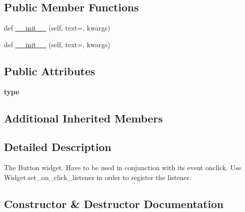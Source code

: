 \subsection*{Public Member Functions}
\begin{DoxyCompactItemize}
\item 
def \hyperlink{classremi_1_1gui_1_1Button_a3384a4af97081503d5cbccc4ff3f3608}{\+\_\+\+\_\+init\+\_\+\+\_\+} (self, text=\textquotesingle{}\textquotesingle{}, kwargs)
\item 
def \hyperlink{classremi_1_1gui_1_1Button_a3384a4af97081503d5cbccc4ff3f3608}{\+\_\+\+\_\+init\+\_\+\+\_\+} (self, text=\textquotesingle{}\textquotesingle{}, kwargs)
\end{DoxyCompactItemize}
\subsection*{Public Attributes}
\begin{DoxyCompactItemize}
\item 
{\bfseries type}\hypertarget{classremi_1_1gui_1_1Button_a6d30954d2a6390dd3e5ecc6a87d3a5eb}{}\label{classremi_1_1gui_1_1Button_a6d30954d2a6390dd3e5ecc6a87d3a5eb}

\end{DoxyCompactItemize}
\subsection*{Additional Inherited Members}


\subsection{Detailed Description}
\begin{DoxyVerb}The Button widget. Have to be used in conjunction with its event onclick.
Use Widget.set_on_click_listener in order to register the listener.
\end{DoxyVerb}
 

\subsection{Constructor \& Destructor Documentation}

